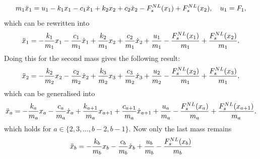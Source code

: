 \begin{equation*}
    m_1\Ddot{x}_1 = u_1 - k_1x_1 - c_1\dot{x}_1 + k_2x_2 + c_2\dot{x}_2 - F_s^{NL}(x_1) + F_s^{NL}(x_2), \quad u_1 = F_1,
\end{equation*}
which can be rewritten into
\begin{equation}\label{eqn:mass-spring-damper-first-mass-eom}
    \Ddot{x}_1 = -\frac{k_1}{m_1}x_1 -\frac{c_1}{m_1}\dot{x}_1 + \frac{k_2}{m_1}x_2 + \frac{c_2}{m_1}\dot{x}_2 + \frac{u_1}{m_1} - \frac{F_s^{NL}(x_1)}{m_1} + \frac{F_s^{NL}(x_2)}{m_1}.
\end{equation}
Doing this for the second mass gives the following result:
\begin{equation*}
    \Ddot{x}_2 = -\frac{k_2}{m_2}x_2 - \frac{c_2}{m_2}\dot{x}_2 + \frac{k_3}{m_2}x_3 + \frac{c_3}{m_2}\dot{x}_3 + \frac{u_2}{m_2} - \frac{F_s^{NL}(x_2)}{m_1} + \frac{F_s^{NL}(x_3)}{m_1}.
\end{equation*}
which can be generalised into
\begin{equation}\label{eqn:mass-spring-damper-centre-mass-eom}
    \Ddot{x}_a =  -\frac{k_a}{m_a}x_a - \frac{c_a}{m_a}\dot{x}_a + \frac{k_{a+1}}{m_a}x_{a+1} + \frac{c_{a+1}}{m_a}\dot{x}_{a+1} + \frac{u_a}{m_a} - \frac{F_s^{NL}(x_a)}{m_a} + \frac{F_s^{NL}(x_{a+1})}{m_a}.
\end{equation}
which holds for $a \in \{2,3,\dots,b-2,b-1\}$. Now only the last mass remains
\begin{equation}\label{eqn:mass-spring-damper-last-mass-eom}
    \Ddot{x}_b = -\frac{k_b}{m_b}x_b - \frac{c_b}{m_b}\dot{x}_b + \frac{u_b}{m_b} - \frac{F_s^{NL}(x_b)}{m_b}
\end{equation}

